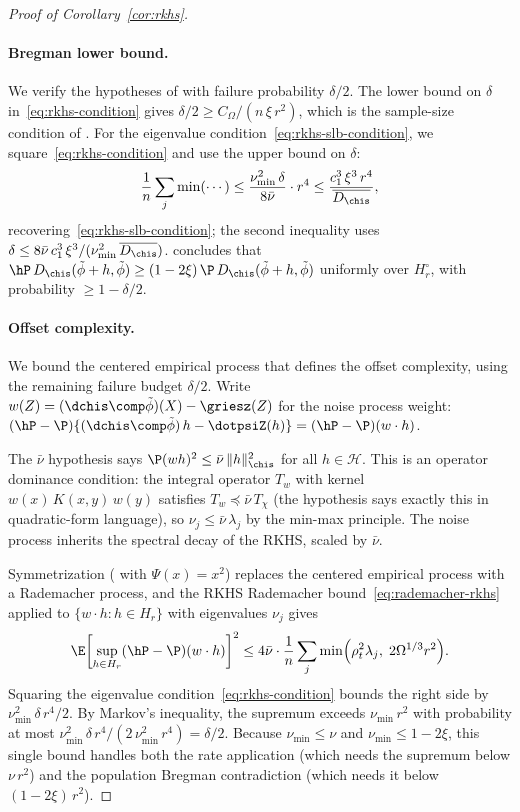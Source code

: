 \documentclass{article}
\begin{document}
\begin{proof}[Proof of Corollary~\ref{cor:rkhs}]
\paragraph{Bregman lower bound.}
We verify the hypotheses of 
with failure probability $\delta/2$.
The lower bound on $\delta$
in~\eqref{eq:rkhs-condition} gives
$\delta/2 \ge C_\Omega/(n\,\xi\,r^2)$,
which is the sample-size condition
of .
For the eigenvalue condition~\eqref{eq:rkhs-slb-condition},
we square~\eqref{eq:rkhs-condition}
and use the upper bound on $\delta$:
\[
\frac{1}{n}\sum_j \min(\cdots)
  \le \frac{\nu_{\min}^2\,\delta}{8\bar\nu}
    \cdot r^4
  \le \frac{c_1^3\,\xi^3\,r^4}
    {\overline{D_{\chis}}},
\]
recovering~\eqref{eq:rkhs-slb-condition};
the second inequality uses
$\delta \le 8\bar\nu\,c_1^3\,\xi^3
  /(\nu_{\min}^2\,\overline{D_{\chis}})$.
 concludes that
$\hP\, D_{\chis}(\tilde\phi+h, \tilde\phi)
  \ge (1-2\xi)\, \P\, D_{\chis}(\tilde\phi+h, \tilde\phi)$
uniformly over $H_r^\circ$,
with probability $\ge 1 - \delta/2$.

\paragraph{Offset complexity.}
We bound the centered empirical process
that defines the offset complexity,
using the remaining failure budget $\delta/2$.
Write $w(Z) = (\dchis \comp \tilde\phi)(X) - \griesz(Z)$
for the noise process weight:
$(\hP - \P)\{(\dchis \comp \tilde\phi)\, h
  - \dotpsiZ(h)\}
= (\hP - \P)(w \cdot h)$.

The $\bar\nu$ hypothesis says
$\P(w h)^2 \le \bar\nu\, \|h\|_{\chis}^2$
for all $h \in \mathcal{H}$.
This is an operator dominance condition:
the integral operator $T_w$
with kernel $w(x)\, K(x,y)\, w(y)$
satisfies $T_w \preceq \bar\nu\, T_\chi$
(the hypothesis says exactly this
in quadratic-form language),
so $\nu_j \le \bar\nu\, \lambda_j$
by the min-max principle.
The noise process inherits
the spectral decay of the RKHS,
scaled by $\bar\nu$.

Symmetrization (
with $\Psi(x) = x^2$)
replaces the centered empirical process
with a Rademacher process,
and the RKHS Rademacher
bound~\eqref{eq:rademacher-rkhs}
applied to $\{w \cdot h : h \in H_r\}$
with eigenvalues $\nu_j$ gives
\[
\E \qty[\sup_{h \in H_r}
  (\hP - \P)(w \cdot h)]^2
\le 4\bar\nu \cdot
  \frac{1}{n}
  \sum_j \min\!\qty(\rho_t^2\lambda_j,\;
    2\Omega^{1/3}r^2).
\]
Squaring the eigenvalue
condition~\eqref{eq:rkhs-condition}
bounds the right side by
$\nu_{\min}^2\,\delta\, r^4/2$.
By Markov's inequality,
the supremum exceeds $\nu_{\min}\, r^2$
with probability at most
$\nu_{\min}^2\,\delta\,r^4
  /(2\,\nu_{\min}^2\,r^4)
  = \delta/2$.
Because $\nu_{\min} \le \nu$
and $\nu_{\min} \le 1-2\xi$,
this single bound handles
both the rate application
(which needs the supremum below $\nu\, r^2$)
and the population Bregman contradiction
(which needs it below $(1-2\xi)\, r^2$).


\end{proof}
\end{document}
